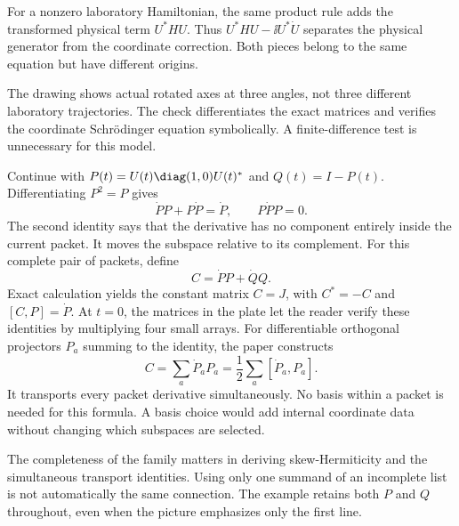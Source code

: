 For a nonzero laboratory Hamiltonian, the same product rule adds the transformed physical term $U^*HU$. Thus $U^*HU-\ii U^*\dot U$ separates the physical generator from the coordinate correction. Both pieces belong to the same equation but have different origins.

The drawing shows actual rotated axes at three angles, not three different laboratory trajectories. The check differentiates the exact matrices and verifies the coordinate Schr\"odinger equation symbolically. A finite-difference test is unnecessary for this model.

Continue with $P(t)=U(t)\diag(1,0)U(t)^*$ and $Q(t)=I-P(t)$. Differentiating $P^2=P$ gives
\[
\dot P P+P\dot P=\dot P,
\qquad P\dot P P=0.
\]
The second identity says that the derivative has no component entirely inside the current packet. It moves the subspace relative to its complement.
For this complete pair of packets, define
\[
C=\dot P P+\dot Q Q.
\]
Exact calculation yields the constant matrix $C=J$, with $C^*=-C$ and $[C,P]=\dot P$. At $t=0$, the matrices in the plate let the reader verify these identities by multiplying four small arrays.
For differentiable orthogonal projectors $P_a$ summing to the identity, the paper constructs
\[
C=\sum_a\dot P_aP_a=\frac12\sum_a[\dot P_a,P_a].
\]
It transports every packet derivative simultaneously. No basis within a packet is needed for this formula. A basis choice would add internal coordinate data without changing which subspaces are selected.

The completeness of the family matters in deriving skew-Hermiticity and the simultaneous transport identities. Using only one summand of an incomplete list is not automatically the same connection. The example retains both $P$ and $Q$ throughout, even when the picture emphasizes only the first line.

